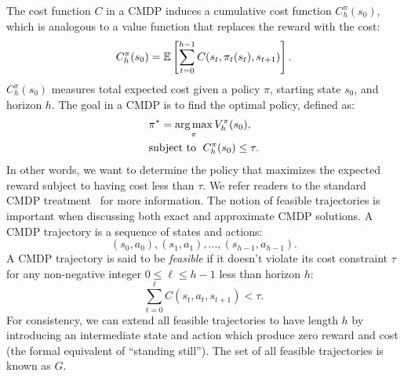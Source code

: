 The cost function $C$ in a CMDP induces a cumulative cost function $C_h^\pi(s_0)$, which is analogous to a value function that replaces the reward with the cost:
\[
    C_h^\pi(s_0) =  {\mathbb E} \left[\sum_{t=0}^{h-1} C(s_t, \pi_t(s_t), s_{t+1}) \right].
\]
$C_h^\pi(s_0)$ measures total expected cost given a policy $\pi$, starting state $s_0$, and horizon $h$.
The goal in a CMDP is to find the optimal policy, defined as:
\begin{align*}
    &\pi^* = \operatorname*{arg\,max}_{\pi} V_h^\pi(s_0), \\
    & \text{subject to } \; C_h^\pi(s_0) \leq \tau.
\end{align*}
In other words, we want to determine the policy that maximizes the expected reward subject to having cost less than $\tau$.
We refer readers to the standard CMDP treatment~\citep{altman1999constrained} for more information.
The notion of feasible trajectories is important when discussing both exact and approximate CMDP solutions.
A CMDP trajectory is a sequence of states and actions:
\[
    (s_0, a_0), (s_1, a_1), \dots, (s_{h-1}, a_{h-1}).
\]
A CMDP trajectory is said to be \textit{feasible} if it doesn't violate its cost constraint $\tau$ for any non-negative integer $0 \leq \ell \leq h-1$ less than horizon $h$:
\[
    \sum_{t=0}^{\ell} C(s_t, a_t, s_{t+1}) < \tau.
\]
For consistency, we can extend all feasible trajectories to have length $h$ by introducing an intermediate state and action which produce zero reward and cost (the formal equivalent of ``standing still'').
The set of all feasible trajectories is known as $G$.

